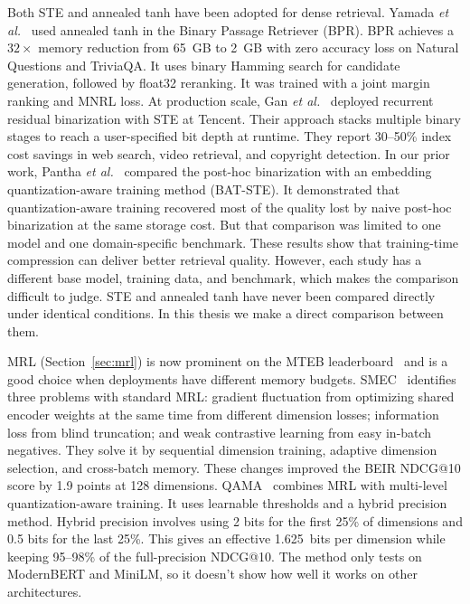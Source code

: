 Both STE and annealed tanh have been adopted for dense retrieval. Yamada \textit{et al.}~\cite{yamada2021efficient} used annealed tanh in the Binary Passage Retriever (BPR). BPR achieves a $32\times$ memory reduction from 65~GB to 2~GB with zero accuracy loss on Natural Questions and TriviaQA. It uses binary Hamming search for candidate generation, followed by float32 reranking. It was trained with a joint margin ranking and MNRL loss. At production scale, Gan \textit{et al.}~\cite{gan2023binary} deployed recurrent residual binarization with STE at Tencent. Their approach stacks multiple binary stages to reach a user-specified bit depth at runtime. They report 30--50\% index cost savings in web search, video retrieval, and copyright detection. In our prior work, Pantha \textit{et al.}~\cite{pantha2026indussde} compared the post-hoc binarization with an embedding quantization-aware training method (BAT-STE). It demonstrated that quantization-aware training recovered most of the quality lost by naive post-hoc binarization at the same storage cost. But that comparison was limited to one model and one domain-specific benchmark. These results show that training-time compression can deliver better retrieval quality. However, each study has a different base model, training data, and benchmark, which makes the comparison difficult to judge. STE and annealed tanh have never been compared directly under identical conditions. In this thesis we make a direct comparison between them.

MRL (Section~\ref{sec:mrl}) is now prominent on the MTEB leaderboard~\cite{muennighoff2022mteb} and is a good choice when deployments have different memory budgets. SMEC~\cite{smec2025} identifies three problems with standard MRL: gradient fluctuation from optimizing shared encoder weights at the same time from different dimension losses; information loss from blind truncation; and weak contrastive learning from easy in-batch negatives. They solve it by sequential dimension training, adaptive dimension selection, and cross-batch memory. These changes improved the BEIR NDCG@10 score by 1.9 points at 128 dimensions. QAMA~\cite{qama2025} combines MRL with multi-level quantization-aware training. It uses learnable thresholds and a hybrid precision method. Hybrid precision involves using 2 bits for the first 25\% of dimensions and 0.5 bits for the last 25\%. This gives an effective 1.625~bits per dimension while keeping 95--98\% of the full-precision NDCG@10. The method only tests on ModernBERT and MiniLM, so it doesn't show how well it works on other architectures.

